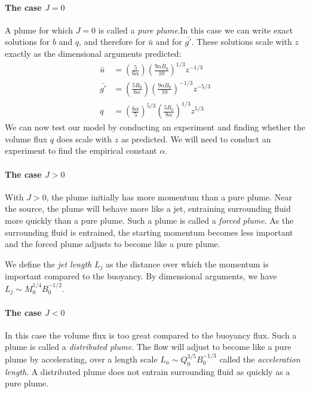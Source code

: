 \paragraph{The case $J=0$} A plume for which $J = 0$ is called a \textit{pure
plume}.In this case we can write exact solutions for $b$ and $q$, and therefore
for $\bar{u}$ and for $\bar{g'}$. These solutions scale with $z$ exactly as the
dimensional arguments predicted:
\begin{align}
    \bar{u} &= \left(\frac{5}{6\alpha}\right) \left( \frac{9\alpha B_0}{10}\right)^{1/3} z^{-1/3} \\
    \bar{g'} &= \left(\frac{5B_0}{6\alpha}\right) \left( \frac{9\alpha
        B_0}{10}\right)^{-1/3} z^{-5/3} \\
        q &= \left(\frac{6\alpha}{5}\right)^{5/3}
        \left(\frac{5B_0}{8\alpha}\right)^{1/3} z^{5/3}
\end{align}
We can now test our model by conducting an experiment and finding whether the
volume flux $q$ does scale with $z$ as predicted. We will need to conduct an
experiment to find the empirical constant $\alpha$.

\paragraph{The case $J>0$} With $J>0$, the plume initially has more momentum
than a pure plume. Near the source, the plume will behave more like a jet,
entraining surrounding fluid more quickly than a pure plume. Such a plume is
called a \textit{forced plume}. As the surrounding fluid is entrained, the
starting momentum becomes less important and the forced plume adjusts to become
like a pure plume.

We define the \textit{jet length} $L_j$ as the distance over which the momentum is
important compared to the buoyancy. By dimensional arguments, we have $L_j \sim
M_0^{1/4} B_0^{-1/2}$.

\paragraph{The case $J<0$} In this case the volume flux is too great compared to
the buoyancy flux. Such a plume is called a \textit{distributed plume}. The flow
will adjust to become like a pure plume by accelerating, over a length scale
$L_a \sim Q_0^{3/5} B_0^{-1/3}$ called the \textit{acceleration length}. A
distributed plume does not entrain surrounding fluid as quickly as a pure plume.

